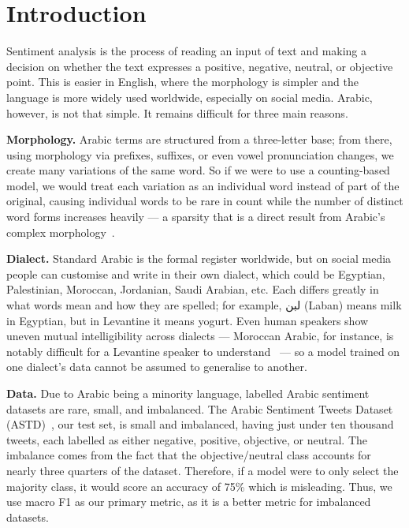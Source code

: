 \documentclass[conference]{IEEEtran}
\begin{document}
\section{Introduction}

Sentiment analysis is the process of reading an input of text and making a
decision on whether the text expresses a positive, negative, neutral, or objective
point. This is easier in English, where the morphology is simpler and the language
is more widely used worldwide, especially on social media. Arabic, however,
is not that simple. It remains difficult for three main reasons.

\textbf{Morphology.} 
Arabic terms are structured from a three-letter base; from there, using morphology
via prefixes, suffixes, or even vowel pronunciation changes, we create many variations
of the same word. So if we were to use a counting-based model, we would treat each variation
as an individual word instead of part of the original, causing individual words to be rare in
count while the number of distinct word forms increases heavily --- a sparsity that
is a direct result from Arabic's complex morphology~\cite{antoun2020arabert}.

\textbf{Dialect.}
Standard Arabic is the formal register worldwide, but on social media people can
customise and write in their own dialect, which could be Egyptian, Palestinian, Moroccan,
Jordanian, Saudi Arabian, etc. Each differs greatly in what words mean and how they are spelled;
for example, لبن (Laban) means milk in Egyptian, but in Levantine it means yogurt. Even human
speakers show uneven mutual intelligibility across dialects --- Moroccan Arabic, for instance,
is notably difficult for a Levantine speaker to understand~\cite{zaidan2014dialect} --- so a
model trained on one dialect's data cannot be assumed to generalise to another.

\textbf{Data.} 
Due to Arabic being a minority language, labelled Arabic sentiment datasets are rare, small, and imbalanced.
The Arabic Sentiment Tweets Dataset (ASTD)~\cite{nabil2015astd}, our test set, is small and imbalanced, having
just under ten thousand tweets, each labelled as either negative, positive, objective, or neutral.
The imbalance comes from the fact that the objective/neutral class accounts for nearly three quarters of the dataset.
Therefore, if a model were to only select the majority class, it would score an accuracy of 75\% which is misleading.
Thus, we use macro F1 as our primary metric, as it is a better metric for imbalanced datasets.
\end{document}
